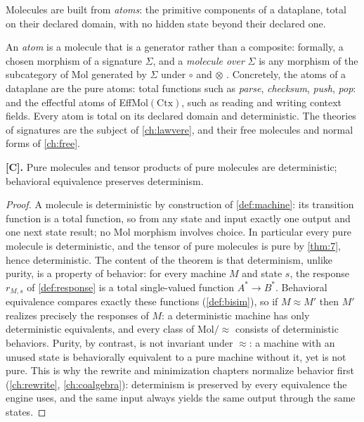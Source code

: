 Molecules are built from \emph{atoms}: the primitive components of a
dataplane, total on their declared domain, with no hidden state beyond their
declared one.

\begin{definition}[Atoms]\label{def:atoms}
An \emph{atom} is a molecule that is a generator rather than a composite:
formally, a chosen morphism of a signature $\Sigma$, and a \emph{molecule
over} $\Sigma$ is any morphism of the subcategory of Mol generated by
$\Sigma$ under $\circ$ and $\otimes$ \citep{lawvere}. Concretely, the atoms
of a dataplane are the pure atoms: total functions such as \emph{parse},
\emph{checksum}, \emph{push}, \emph{pop}: and the effectful atoms of
EffMol$(\mathrm{Ctx})$, such as reading and writing context fields. Every
atom is total on its declared domain and deterministic. The theories of
signatures are the subject of \autoref{ch:lawvere}, and their free molecules
and normal forms of \autoref{ch:free}.
\end{definition}

\begin{theorem}\label{thm:8}
\textbf{[C].} Pure molecules and tensor products of pure molecules are
deterministic; behavioral equivalence preserves determinism.
\end{theorem}

\begin{proof}
A molecule is deterministic by construction of \autoref{def:machine}: its
transition function is a total function, so from any state and input exactly
one output and one next state result; no Mol morphism involves choice. In
particular every pure molecule is deterministic, and the tensor of pure
molecules is pure by \autoref{thm:7}, hence deterministic. The content of the
theorem is that determinism, unlike purity, is a property of behavior: for
every machine $M$ and state $s$, the response $r_{M,s}$ of \autoref{def:response}
is a total single-valued function $A^{*} \to B^{*}$. Behavioral equivalence
compares exactly these functions (\autoref{def:bisim}), so if
$M \approx M'$ then $M'$ realizes precisely the responses of $M$: a
deterministic machine has only deterministic equivalents, and every class of
$\mathrm{Mol}/{\approx}$ consists of deterministic behaviors. Purity, by
contrast, is not invariant under $\approx$: a machine with an unused state is
behaviorally equivalent to a pure machine without it, yet is not pure. This
is why the rewrite and minimization chapters normalize behavior first
(\autoref{ch:rewrite}, \autoref{ch:coalgebra}): determinism is preserved by
every equivalence the engine uses, and the same input always yields the same
output through the same states.
\end{proof}

